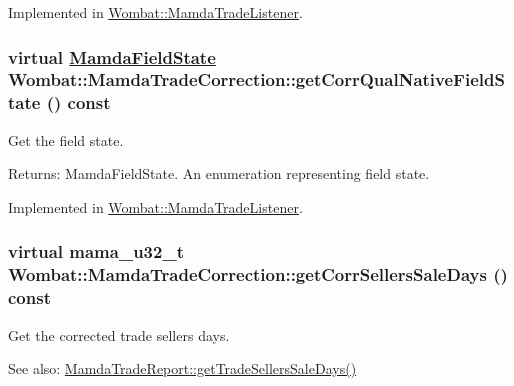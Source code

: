 Implemented in \hyperlink{classWombat_1_1MamdaTradeListener_6b897066a80ca51774b8aa13e676b180}{Wombat::Mamda\-Trade\-Listener}.\hypertarget{classWombat_1_1MamdaTradeCorrection_733dac2fd8b2b932abca4dff5bad8fbc}{
\subsubsection[getCorrQualNativeFieldState]{\setlength{\rightskip}{0pt plus 5cm}virtual \hyperlink{namespaceWombat_93aac974f2ab713554fd12a1fa3b7d2a}{Mamda\-Field\-State} Wombat::Mamda\-Trade\-Correction::get\-Corr\-Qual\-Native\-Field\-State () const}}
\label{classWombat_1_1MamdaTradeCorrection_733dac2fd8b2b932abca4dff5bad8fbc}


Get the field state. 

\begin{Desc}
\item[Returns:]Mamda\-Field\-State. An enumeration representing field state. \end{Desc}


Implemented in \hyperlink{classWombat_1_1MamdaTradeListener_4c89a664befaa59336cd1a86204dfc48}{Wombat::Mamda\-Trade\-Listener}.\hypertarget{classWombat_1_1MamdaTradeCorrection_95b91482ecf2a00c648446a8504f0fbf}{
\subsubsection[getCorrSellersSaleDays]{\setlength{\rightskip}{0pt plus 5cm}virtual mama\_\-u32\_\-t Wombat::Mamda\-Trade\-Correction::get\-Corr\-Sellers\-Sale\-Days () const}}
\label{classWombat_1_1MamdaTradeCorrection_95b91482ecf2a00c648446a8504f0fbf}


Get the corrected trade sellers days. 

\begin{Desc}
\item[See also:]\hyperlink{classWombat_1_1MamdaTradeReport_c9ed0e49599c96128f6be2a1e3390a33}{Mamda\-Trade\-Report::get\-Trade\-Sellers\-Sale\-Days()} \end{Desc}


